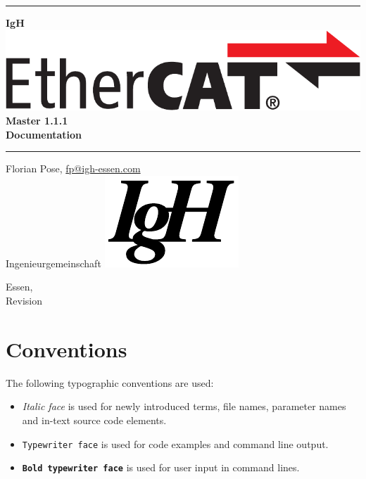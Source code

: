 \documentclass[a4paper,12pt,BCOR6mm,bibtotoc,idxtotoc]{scrbook}
\newcommand{\IgH}{\raisebox{-0.7667ex}
  {\includegraphics[height=2.2ex]{images/ighsign}}}
\newcommand{\masterversion}{1.1.1}
\begin{document}
\pagestyle{empty}

\begin{titlepage}
  \begin{center}
    \rule{\textwidth}{1.5mm}

    {\Huge\bf IgH \includegraphics[height=2.4ex]{images/ethercat}
      Master \masterversion\\[1ex]
      Documentation}

    \vspace{1ex}
    \rule{\textwidth}{1.5mm}

    \vspace{\fill}
    {\Large Florian Pose, \url{fp@igh-essen.com}\\[1ex]
      Ingenieurgemeinschaft \IgH}

    \vspace{\fill}
    {\Large Essen, \SVNDate\\[1ex]
      Revision \SVNRevision}
  \end{center}
\end{titlepage}


\tableofcontents
\listoftables
\listoffigures
\lstlistoflistings


\newpage
\pagestyle{scrheadings}

\section*{Conventions}

The following typographic conventions are used:

\begin{itemize}
\item \textit{Italic face} is used for newly introduced terms, file
  names, parameter names and in-text source code elements.
\item \texttt{Typewriter face} is used for code examples and
  command line output.
\item \texttt{\textbf{Bold typewriter face}} is used for user input in
  command lines.
\end{itemize}
\end{document}
